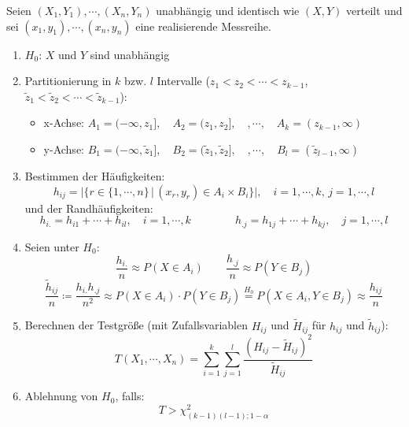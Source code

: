 \documentclass[a4paper, 11pt, accentcolor = tud3b]{tudreport}
\newcommand{\forwhich}{\ensuremath{{\,\vert\,}}}
\begin{document}
                Seien \( (X_1, Y_1), \cdots, (X_n, Y_n) \) unabhängig und identisch wie \( (X, Y) \) verteilt und sei \( (x_1, y_1), \cdots, (x_n, y_n) \) eine realisierende Messreihe.
                \begin{enumerate}
                	\item \(H_0\): \quad \(X\) und \(Y\) sind unabhängig
                	\item Partitionierung in \(k\) bzw. \(l\) Intervalle (\( z_1 < z_2 < \cdots < z_{k-1} \), \( \tilde{z}_1 < \tilde{z}_2 < \cdots < \tilde{z}_{k-1} \)):
	                	\begin{itemize}
	                		\item x-Achse: \( A_1 = (-\infty, z_1], \quad A_2 = (z_1, z_2], \quad, \cdots, \quad A_k = (z_{k-1}, \infty) \)
	                		\item y-Achse: \( B_1 = (-\infty, \tilde{z}_1], \quad B_2 = (\tilde{z}_1, \tilde{z}_2], \quad, \cdots, \quad B_l = (\tilde{z}_{l-1}, \infty) \)
	                	\end{itemize}
                	\item Bestimmen der Häufigkeiten:
	                	\begin{equation*}
		                	h_{ij} = \Big| \big\{ r \in \{ 1, \cdots, n \} \forwhich (x_r, y_r) \in A_i \times B_i \big\} \Big|, \quad i = 1, \cdots, k,\, j = 1, \cdots, l
	                	\end{equation*}
	                	und der Randhäufigkeiten:
	                	\begin{equation*}
		                	h_{i.} = h_{i1} + \cdots + h_{il}, \quad i = 1, \cdots, k \qquad\qquad h_{.j} = h_{1j} + \cdots + h_{kj}, \quad j = 1, \cdots, l
	                	\end{equation*}
		            \item Seien unter \(H_0\):
			            \begin{equation*}
				            \frac{h_{i.}}{n} \approx P(X \in A_i) \qquad \frac{h_{.j}}{n} \approx P(Y \in B_j)
			            \end{equation*}
			            \begin{equation*}
				            \frac{\tilde{h}_{ij}}{n} \coloneqq \frac{h_{i.} h_{.j}}{n^2} \approx P(X \in A_i) \cdot P(Y \in B_j) \overset{H_0}{=} P(X \in A_i, Y \in B_j) \approx \frac{h_{ij}}{n}
			            \end{equation*}
				    \item Berechnen der Testgröße (mit Zufallsvariablen \( H_{ij} \) und \( \tilde{H}_{ij} \) für \( h_{ij} \) und \( \tilde{h}_{ij} \)):
					    \begin{equation*}
						    T(X_1, \cdots, X_n) = \sum_{i = 1}^{k} \sum_{j = 1}^{l} \frac{(H_{ij} - \tilde{H}_{ij})^2}{\tilde{H}_{ij}}
					    \end{equation*}
					\item Ablehnung von \(H_0\), falls:
						\begin{equation*}
							T > \chi_{(k - 1)(l - 1); 1 - \alpha}^2
						\end{equation*}
                \end{enumerate}
\end{document}
